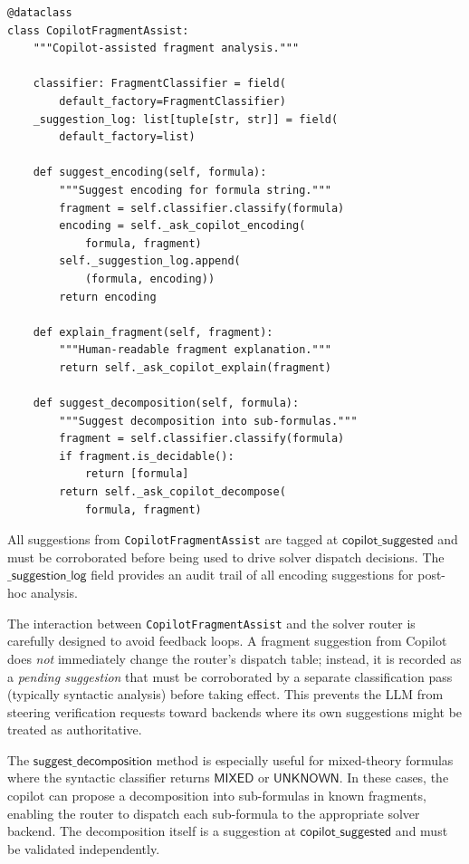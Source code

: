 \documentclass[11pt]{article}
\newcommand{\CopFragment}{\texttt{CopilotFragmentAssist}}
\newcommand{\copilottrust}{$\mathsf{copilot\_suggested}$}
\begin{document}
\begin{lstlisting}[style=jugeo-python,caption={CopilotFragmentAssist.}]
@dataclass
class CopilotFragmentAssist:
    """Copilot-assisted fragment analysis."""

    classifier: FragmentClassifier = field(
        default_factory=FragmentClassifier)
    _suggestion_log: list[tuple[str, str]] = field(
        default_factory=list)

    def suggest_encoding(self, formula):
        """Suggest encoding for formula string."""
        fragment = self.classifier.classify(formula)
        encoding = self._ask_copilot_encoding(
            formula, fragment)
        self._suggestion_log.append(
            (formula, encoding))
        return encoding

    def explain_fragment(self, fragment):
        """Human-readable fragment explanation."""
        return self._ask_copilot_explain(fragment)

    def suggest_decomposition(self, formula):
        """Suggest decomposition into sub-formulas."""
        fragment = self.classifier.classify(formula)
        if fragment.is_decidable():
            return [formula]
        return self._ask_copilot_decompose(
            formula, fragment)
\end{lstlisting}

All suggestions from \CopFragment{} are tagged at \copilottrust{}
and must be corroborated before being used to drive solver
dispatch decisions.  The $\mathsf{\_suggestion\_log}$ field
provides an audit trail of all encoding suggestions for post-hoc
analysis.

The interaction between \CopFragment{} and the solver router is
carefully designed to avoid feedback loops.  A fragment suggestion
from Copilot does \emph{not} immediately change the router's
dispatch table; instead, it is recorded as a \emph{pending
suggestion} that must be corroborated by a separate classification
pass (typically syntactic analysis) before taking effect.  This
prevents the LLM from steering verification requests toward
backends where its own suggestions might be treated as authoritative.

\begin{remark}
The $\mathsf{suggest\_decomposition}$ method is especially useful
for mixed-theory formulas where the syntactic classifier returns
$\mathsf{MIXED}$ or $\mathsf{UNKNOWN}$.  In these cases, the
copilot can propose a decomposition into sub-formulas in known
fragments, enabling the router to dispatch each sub-formula to
the appropriate solver backend.  The decomposition itself is a
suggestion at \copilottrust{} and must be validated independently.
\end{remark}
\end{document}

